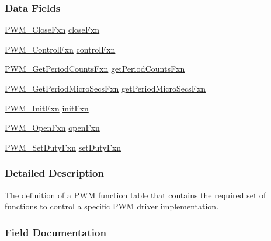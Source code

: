 \subsubsection*{Data Fields}
\begin{DoxyCompactItemize}
\item 
\hyperlink{_p_w_m_8h_a20139b14a696a3e8b0d13adb73760aac}{P\-W\-M\-\_\-\-Close\-Fxn} \hyperlink{struct_p_w_m___fxn_table_a1d6e6575c66ae470f23dc2f40e54706c}{close\-Fxn}
\item 
\hyperlink{_p_w_m_8h_a6dde480b468175d730b22d7081f4678a}{P\-W\-M\-\_\-\-Control\-Fxn} \hyperlink{struct_p_w_m___fxn_table_af96cd80b3f63291664e9268cd7a30cbc}{control\-Fxn}
\item 
\hyperlink{_p_w_m_8h_add39d810106afecc9c4f311baf940244}{P\-W\-M\-\_\-\-Get\-Period\-Counts\-Fxn} \hyperlink{struct_p_w_m___fxn_table_a5cbb6714cf9cd77a27c10fcd16c79da9}{get\-Period\-Counts\-Fxn}
\item 
\hyperlink{_p_w_m_8h_a001a5aac3f5df42fbcc00ecea8d9e7cb}{P\-W\-M\-\_\-\-Get\-Period\-Micro\-Secs\-Fxn} \hyperlink{struct_p_w_m___fxn_table_a232b1047381c21969af72160bebf329c}{get\-Period\-Micro\-Secs\-Fxn}
\item 
\hyperlink{_p_w_m_8h_a427ec22f2d4e0ed90d90a5ee2fb0642f}{P\-W\-M\-\_\-\-Init\-Fxn} \hyperlink{struct_p_w_m___fxn_table_aebcde91c512c962f100d13f511789254}{init\-Fxn}
\item 
\hyperlink{_p_w_m_8h_a9b5584df6c245da07aa971b217729cf1}{P\-W\-M\-\_\-\-Open\-Fxn} \hyperlink{struct_p_w_m___fxn_table_aca1bd99df949b2e0121ff90598279441}{open\-Fxn}
\item 
\hyperlink{_p_w_m_8h_ad6ff34d4a9e084d7c4edee8c7a1a29a1}{P\-W\-M\-\_\-\-Set\-Duty\-Fxn} \hyperlink{struct_p_w_m___fxn_table_a766700e0a02097f9fd2d332b71082605}{set\-Duty\-Fxn}
\end{DoxyCompactItemize}


\subsubsection{Detailed Description}
The definition of a P\-W\-M function table that contains the required set of functions to control a specific P\-W\-M driver implementation. 

\subsubsection{Field Documentation}
